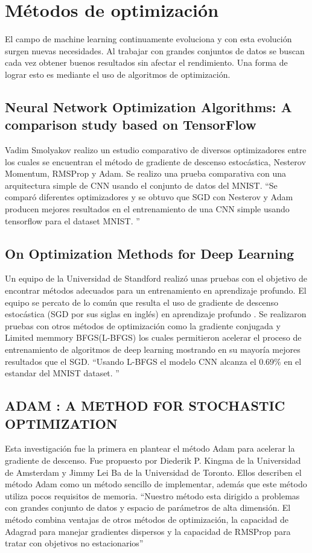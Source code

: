 \section{Métodos de optimización}
El campo de machine learning continuamente evoluciona y con esta evolución surgen nuevas necesidades. Al trabajar con grandes conjuntos de datos se buscan cada vez obtener buenos resultados sin afectar el rendimiento. Una forma de lograr esto es mediante el uso de algoritmos de optimización.
\subsection{Neural Network Optimization Algorithms: A comparison study based on TensorFlow}
Vadim Smolyakov\cite{WEBSITE:11} realizo un estudio comparativo de diversos optimizadores entre los cuales se encuentran el método de gradiente de descenso estocástica, Nesterov Momentum, RMSProp y Adam. Se realizo una prueba comparativa con una arquitectura simple de CNN usando el conjunto de datos del MNIST. \textquotedblleft Se comparó diferentes optimizadores y se obtuvo que SGD con Nesterov y Adam producen mejores resultados en el entrenamiento de una CNN simple usando tensorflow para el dataset MNIST. \textquotedblright \cite{WEBSITE:11}
\subsection{On Optimization Methods for Deep Learning}
Un equipo de la Universidad de Standford realizó unas pruebas con el objetivo de encontrar métodos adecuados para un entrenamiento en aprendizaje profundo. El equipo se percato de lo común que resulta el uso de gradiente de descenso estocástica (SGD por sus siglas en inglés) en aprendizaje profundo . Se realizaron pruebas con otros métodos de optimización como la gradiente conjugada y Limited memmory BFGS(L-BFGS) los cuales permitieron acelerar el proceso de entrenamiento de algoritmos de deep learning mostrando en su mayoría mejores resultados que el SGD. \textquotedblleft Usando L-BFGS el modelo CNN alcanza el 0.69\%  en el estandar del MNIST dataset. \textquotedblright \cite{Optimization}

\subsection{ADAM : A METHOD FOR STOCHASTIC OPTIMIZATION}
Esta investigación fue la primera en plantear el método Adam para acelerar la gradiente de descenso. Fue propuesto por Diederik P. Kingma de la Universidad de Amsterdam y Jimmy Lei Ba de la Universidad de Toronto. Ellos describen el método Adam como un método sencillo de implementar, además que este método utiliza pocos requisitos de memoria.
\textquotedblleft Nuestro método esta dirigido a problemas con grandes conjunto de datos y espacio de parámetros de alta dimensión. El método combina ventajas de otros métodos de optimización, la capacidad de Adagrad para manejar gradientes dispersos y la capacidad de RMSProp para tratar con objetivos no estacionarios\textquotedblright \cite{ADAM}
